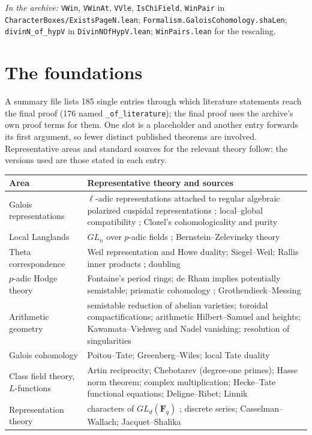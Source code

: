 \documentclass[11pt]{article}
\newcommand{\Lean}[1]{\texttt{\small #1}}
\newcommand{\inarch}[1]{\par{\small\raggedright\noindent\emph{In the archive:} #1\par}}
\begin{document}
\inarch{\Lean{VWin}, \Lean{VWinAt}, \Lean{VVle}, \Lean{IsChiField}, \Lean{WinPair} in \Lean{CharacterBoxes/ExistsPageN.lean}; \Lean{Formalism.GaloisCohomology.shaLen}; \Lean{divinN\_of\_hypV} in \Lean{DivinNOfHypV.lean}; \Lean{WinPairs.lean} for the rescaling.}

\section{The foundations}\label{sec:found}
A summary file lists 185 single entries through which literature statements reach the final proof (176 named \Lean{\_of\_literature}); the final proof uses the archive's own proof terms for them. One slot is a placeholder and another entry forwards its first argument, so fewer distinct published theorems are involved. Representative areas and standard sources for the relevant theory follow; the versions used are those stated in each entry.

\medskip
\noindent\begin{tabularx}{\linewidth}{@{}lX@{}}
\toprule
Area & Representative theory and sources\\
\midrule
Galois representations & $\ell$-adic representations attached to regular algebraic polarized cuspidal representations \cite{shin}; local--global compatibility \cite{caraiani12,caraiani14,ty}; Clozel's cohomologicality and purity\\
Local Langlands & $GL_n$ over $p$-adic fields \cite{ht,henniart}; Bernstein--Zelevinsky theory\\
Theta correspondence & Weil representation and Howe duality; Siegel--Weil; Rallis inner products \cite{rallis}; doubling \cite{psr}\\
$p$-adic Hodge theory & Fontaine's period rings; de Rham implies potentially semistable; prismatic cohomology \cite{bs}; Grothendieck--Messing\\
Arithmetic geometry & semistable reduction of abelian varieties; toroidal compactifications; arithmetic Hilbert--Samuel and heights; Kawamata--Viehweg and Nadel vanishing; resolution of singularities\\
Galois cohomology & Poitou--Tate; Greenberg--Wiles; local Tate duality\\
Class field theory, $L$-functions & Artin reciprocity; Chebotarev (degree-one primes); Hasse norm theorem; complex multiplication; Hecke--Tate functional equations; Deligne--Ribet; Linnik\\
Representation theory & characters of $GL_d(\mathbf F_q)$ \cite{green}; discrete series; Casselman--Wallach; Jacquet--Shalika\\
\bottomrule
\end{tabularx}
\end{document}
